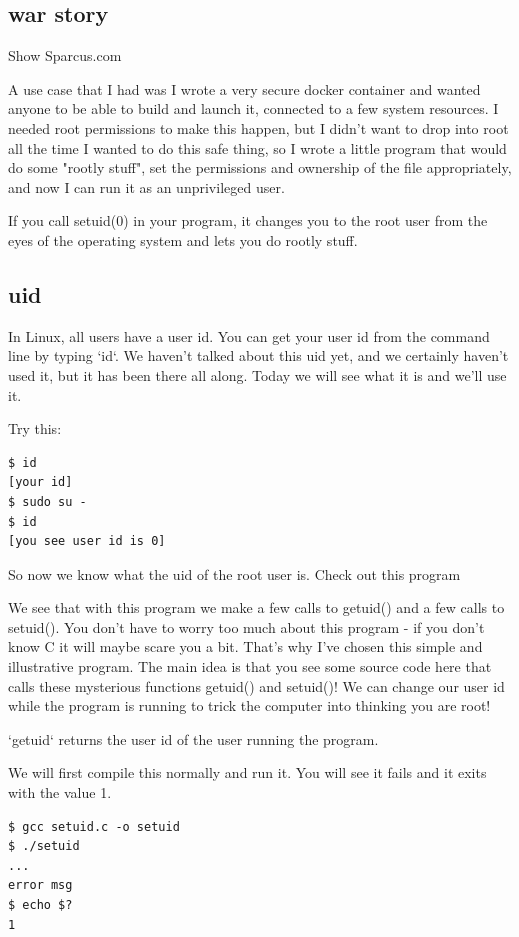 \documentclass[12pt]{article}
\begin{document}
\subsection{war story}
Show Sparcus.com

A use case that I had was I wrote a very secure docker container and wanted anyone to be able to build and launch it, connected to a few system resources. I needed root permissions to make this happen, but I didn't want to drop into root all the time I wanted to do this safe thing, so I wrote a little program that would do some "rootly stuff", set the permissions and ownership of the file appropriately, and now I can run it as an unprivileged user.

If you call setuid(0) in your program, it changes you to the root user from the eyes of the operating system and lets you do rootly stuff.

\subsection{uid}
In Linux, all users have a user id. You can get your user id from the command line by typing `id`. We haven't talked about this uid yet, and we certainly haven't used it, but it has been there all along. Today we will see what it is and we'll use it.

Try this:
\begin{lstlisting}
$ id
[your id]
$ sudo su -
$ id
[you see user id is 0]
\end{lstlisting}

So now we know what the uid of the root user is. Check out this program




We see that with this program we make a few calls to getuid() and a few calls to setuid(). You don't have to worry too much about this program - if you don't know C it will maybe scare you a bit. That's why I've chosen this simple and illustrative program.  The main idea is that you see some source code here that calls these mysterious functions getuid() and setuid()! We can change our user id while the program is running to trick the computer into thinking you are root!

`getuid` returns the user id of the user running the program.


We will first compile this normally and run it. You will see it fails and it exits with the value 1.

\begin{lstlisting}
$ gcc setuid.c -o setuid
$ ./setuid
...
error msg
$ echo $?
1
\end{lstlisting}
\end{document}
